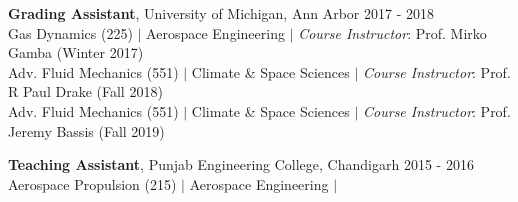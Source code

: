 \documentclass[10pt]{article}
\begin{document}
\vspace{-1em}
\textbf{Grading Assistant}, {{University of Michigan, Ann Arbor}} \hfill \normalsize{2017 - 2018}\\ 
Gas Dynamics (225) $|$ Aerospace Engineering $|$ \normalsize{\textit{Course Instructor}: Prof. Mirko Gamba (Winter 2017)}\\
Adv. Fluid Mechanics (551) $|$ Climate \& Space Sciences $|$ \normalsize{\textit{Course Instructor}: Prof. R Paul Drake (Fall 2018)}\\
Adv. Fluid Mechanics (551) $|$ Climate \& Space Sciences $|$ \normalsize{\textit{Course Instructor}: Prof. Jeremy Bassis (Fall 2019)}

\vspace{0.35em}
\textbf{Teaching Assistant}, {{Punjab Engineering College, Chandigarh}} \hfill 2015 - 2016\\
Aerospace Propulsion (215) $|$ Aerospace Engineering $|$
\end{document}
